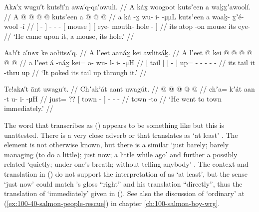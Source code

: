 \ex\label{ex:91-224-came-upon-mouse-hole}%
%
\begingl
	\glpreamble	Akᴀ′x wugu′t kuts!ī′n awᴀ′q-qa′owuli. //
	\glpreamble	A káx̱ woogoot kutsʼeen a waḵx̱ʼawoolí. //
	\gla	{} A  @ {} {}
		 @ {} @ {} @ {}
		{} kutsʼeen {}
		{} a  @ {} @ {} @ {} {} //
	\glb	{} a ká -x̱ {}
		wu- i-  -μμL
		{} kutsʼeen {}
		{} a waaḵ- x̱ʼé- wool -í {} //
	\glc	{}[   - {}]
		- -  -
		{}[ mouse {}]
		{}[  eye- mouth- hole - {}] //
	\gld	{} its atop -on {}
		 {} {} {} 
		{} mouse {}
		{} its eye-  {} {} {} //
	\glft	‘He came upon it, a mouse, its hole.’
		//
\endgl
\xe


\ex\label{ex:91-225-poke-tail-up-thru}%
%
\begingl
	\glpreamble	Aʟ!ī′t a′nᴀx kē aołitsᴀ′q. //
	\glpreamble	A lʼeet aanáx̱ kei awlitsáḵ. //
	\gla	{} A lʼeet {} {}  @ {} {}
		kei @  @ {} @ {} @ {} @ {} @ {} //
	\glb	{} a lʼeet {} {} á -náx̱ {}
		kei= a- wu- l- i-  -μH //
	\glc	{}[  tail {}] {}[  - {}]
		up= - - - -  - //
	\gld	{} its tail {} {} it -thru {}
		up  {} {} {} {} {} //
	\glft	‘It poked its tail up through it.’
		//
\endgl
\xe

\ex\label{ex:91-226-went-to-town}%
%
\begingl
	\glpreamble	Tc!akᴀ′t ānt uwagu′t. //
	\glpreamble	Chʼakʼát aant uwagút. //
	\gla	{} @ {} {}  @ {} {}
		 @ {} @ {} @ {} //
	\glb	chʼa= kʼát {} aan -t {} 
		u- i-  -μH //
	\glc	just= ?? {}[ town - {}]
		- -  - //
	\gld	{} {} {} town -to {}
		 {} {} {} //
	\glft	‘He went to town immediately.’
		//
\endgl
\xe

The word that \citeauthor{swanton:1909} transcribes as  (\lastx) appears to be something like  but this is unattested.
There is a very close adverb  or  that \citeauthor{leer:1973} translates as ‘at least’ \parencites[f04/89]{leer:1973}[66]{leer:1978b}.
The  element is not otherwise known, but there is a similar  ‘just barely; barely managing (to do a little); just now; a little while ago’ \parencite[\textsc{t}·5]{leer:2001} and further a possibly related  ‘quietly; under one’s breath; without telling anybody’ \parencite[\textsc{t}·83]{leer:2001}.
The context and translation in (\lastx) do not support the interpretation of  as ‘at least’, but the sense ‘just now’ could match \citeauthor{swanton:1909}’s gloss “right” and his translation “directly”, thus the translation of ‘immediately’ given in (\lastx).
See also the discussion of  ‘ordinary’ at (\ref{ex:100-40-salmon-people-rescue}) in chapter \ref{ch:100-salmon-boy-wrg}.

